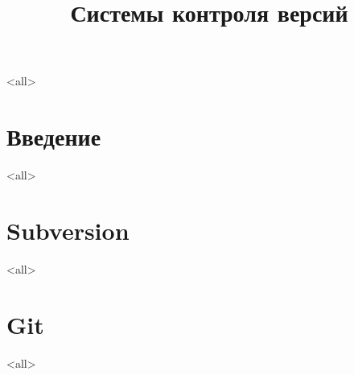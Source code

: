 

\title[VCS]{Системы контроля версий}

\mode<all>{}




\begin{frame}
	\frametitle{}
	\titlepage
	\vspace{-0.5cm}
	\begin{center}
	\end{center}
\end{frame}

\begin{frame}
	\tableofcontents
\end{frame}




\section{Введение}
\mode<all>{}

\section[SVN]{Subversion}
\mode<all>{}

\section{Git}
\mode<all>{}


